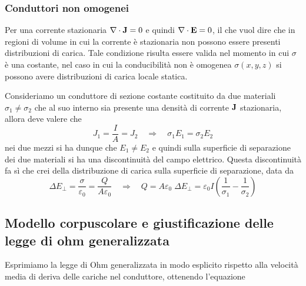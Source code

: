 \subsubsection{Conduttori non omogenei}

Per una corrente stazionaria $\nabla \cdot \bold{J} = 0$ e quindi $\nabla \cdot \bold{E} = 0$, il che vuol dire che in regioni di volume in cui la corrente \`e stazionaria non possono essere presenti distribuzioni di carica. Tale condizione risulta essere valida nel momento in cui $\sigma $ \`e una costante, nel caso in cui la conducibilit\`a non \`e omogenea $\sigma(x,y,z)$ si possono avere distribuzioni di carica locale statica.


Consideriamo un conduttore di sezione costante costituito da due materiali $\sigma_{1} \neq \sigma_{2}$ che al suo interno sia presente una densit\`a di corrente $\bold{J}$ stazionaria, allora deve valere che 
\begin{equation*}
	J_{1} = \frac{I}{A} = J_{2} \quad \Longrightarrow \quad \sigma_{1}E_{1} = \sigma_{2} E_{2} 
\end{equation*}
nei due mezzi si ha dunque che $E_{1} \neq E_{2}$ e quindi sulla superficie di separazione dei due materiali si ha una discontinuit\`a del campo elettrico. Questa discontinuit\`a fa s\`i  che crei della distribuzione di carica sulla superficie di separazione, data da 
\begin{equation*}
	\Delta E_{\bot} = \frac{\sigma}{\varepsilon_0} = \frac{Q}{A \varepsilon_0}  \quad \Longrightarrow \quad Q = A \varepsilon_0 \;\Delta E_{\bot} = \varepsilon_0 I \left(\frac{1}{\sigma_1} - \frac{1}{\sigma_2}\right)
\end{equation*}

\subsection{Modello corpuscolare e giustificazione delle legge di ohm generalizzata}

Esprimiamo la legge di Ohm generalizzata in modo esplicito rispetto alla velocit\`a media di deriva delle cariche nel conduttore, ottenendo l'equazione

